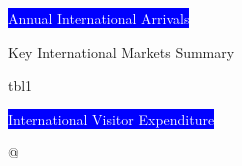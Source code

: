 \begin{minipage}{0.49\textwidth}
\begin{flushleft}

{\colorbox{blue}{\textcolor{white}{\scriptsize Annual International Arrivals}}}\par
{\tiny Key International Markets Summary}





\begin{table}
tbl1
\end{table}

%

\end{flushleft}
\end{minipage}

\begin{minipage}{0.49\textwidth}
\begin{flushright} 
{\colorbox{blue}{\textcolor{white}{\scriptsize International Visitor Expenditure}}}\par






@
\begin{table}[ht]
\centering
{}
\end{table}


\end{flushright}
\end{minipage}


